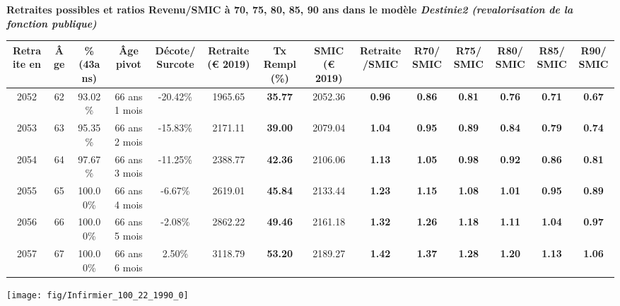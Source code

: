  \vspace{0.1cm} 
{\bf \noindent Retraites possibles et ratios Revenu/SMIC à 70, 75, 80, 85, 90 ans dans le modèle \emph{Destinie2 (revalorisation de la fonction publique)}}  
 
\begin{adjustbox}{max width=\textwidth} 
\begin{tabular}[htb]{|c|c||c|c|c||c|c||c|c||c|c|c|c|c|} 
\hline 
 Retraite en &  Âge &  \%(43ans) &  Âge pivot &  Décote/Surcote &  Retraite (\euro{} 2019) &  Tx Rempl(\%) &  SMIC (\euro{} 2019) &  Retraite/SMIC &  R70/SMIC &  R75/SMIC &  R80/SMIC &  R85/SMIC &  R90/SMIC \\ 
\hline \hline 
 2052 &  62 &  93.02\% &  66 ans 1 mois &  -20.42\% &  1965.65 &  {\bf 35.77} &  2052.36 &  {\bf {\color{red} 0.96}} &  {\bf {\color{red} 0.86}} &  {\bf {\color{red} 0.81}} &  {\bf {\color{red} 0.76}} &  {\bf {\color{red} 0.71}} &  {\bf {\color{red} 0.67}} \\ 
\hline 
 2053 &  63 &  95.35\% &  66 ans 2 mois &  -15.83\% &  2171.11 &  {\bf 39.00} &  2079.04 &  {\bf 1.04} &  {\bf {\color{red} 0.95}} &  {\bf {\color{red} 0.89}} &  {\bf {\color{red} 0.84}} &  {\bf {\color{red} 0.79}} &  {\bf {\color{red} 0.74}} \\ 
\hline 
 2054 &  64 &  97.67\% &  66 ans 3 mois &  -11.25\% &  2388.77 &  {\bf 42.36} &  2106.06 &  {\bf 1.13} &  {\bf 1.05} &  {\bf {\color{red} 0.98}} &  {\bf {\color{red} 0.92}} &  {\bf {\color{red} 0.86}} &  {\bf {\color{red} 0.81}} \\ 
\hline 
 2055 &  65 &  100.00\% &  66 ans 4 mois &  -6.67\% &  2619.01 &  {\bf 45.84} &  2133.44 &  {\bf 1.23} &  {\bf 1.15} &  {\bf 1.08} &  {\bf 1.01} &  {\bf {\color{red} 0.95}} &  {\bf {\color{red} 0.89}} \\ 
\hline 
 2056 &  66 &  100.00\% &  66 ans 5 mois &  -2.08\% &  2862.22 &  {\bf 49.46} &  2161.18 &  {\bf 1.32} &  {\bf 1.26} &  {\bf 1.18} &  {\bf 1.11} &  {\bf 1.04} &  {\bf {\color{red} 0.97}} \\ 
\hline 
 2057 &  67 &  100.00\% &  66 ans 6 mois &  2.50\% &  3118.79 &  {\bf 53.20} &  2189.27 &  {\bf 1.42} &  {\bf 1.37} &  {\bf 1.28} &  {\bf 1.20} &  {\bf 1.13} &  {\bf 1.06} \\ 
\hline 
\hline 
\end{tabular} 
\end{adjustbox} 
 
 \vspace{0.1cm} 

 {\hspace{-2.2cm}\texttt{[image: fig/Infirmier\_100\_22\_1990\_0]}} 

